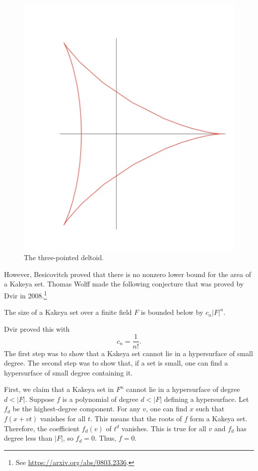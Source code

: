 \documentclass[11pt, oneside,margin=1in]{article}
\begin{document}
\begin{figure}
	\begin{center}
		\includegraphics[scale=0.5]{images/kakeya_deltoid}
		\caption{The three-pointed deltoid.}
	\end{center}
\end{figure}

However, Besicovitch proved that there is no nonzero lower bound for the area of a Kakeya set. Thomas Wolff made the following conjecture that was proved by Dvir in 2008.\footnote{See \url{https://arxiv.org/abs/0803.2336}.}
\begin{theorem}\label{}\index{}\text{}
The size of a Kakeya set over a finite field $F$ is bounded below by $c_n\left\lvert F \right\rvert ^n$.
\end{theorem}
Dvir proved this with $$c_n = \frac{1}{n!}.$$ The first step was to show that a Kakeya set cannot lie in a hypersurface of small degree. The second step was to show that, if a set is small, one can find a hypersurface of small degree containing it.

First, we claim that a Kakeya set in $F^n$ cannot lie in a hypersurface of degree $d<\left\lvert F \right\rvert $. Suppose $f$ is a polynomial of degree $d<\left\lvert F \right\rvert $ defining a hypersurface. Let $f_d$ be the highest-degree component. For any $v$, one can find $x$ such that $f(x+vt)$ vanishes for all $t$. This means that the roots of $f$ form a Kakeya set. Therefore, the coefficient $f_d(v)$ of $t^d$ vanishes. This is true for all $v$ and $f_d$ has degree less than $\left\lvert F \right\rvert $, so $f_d=0$. Thus, $f=0$.
\end{document}
